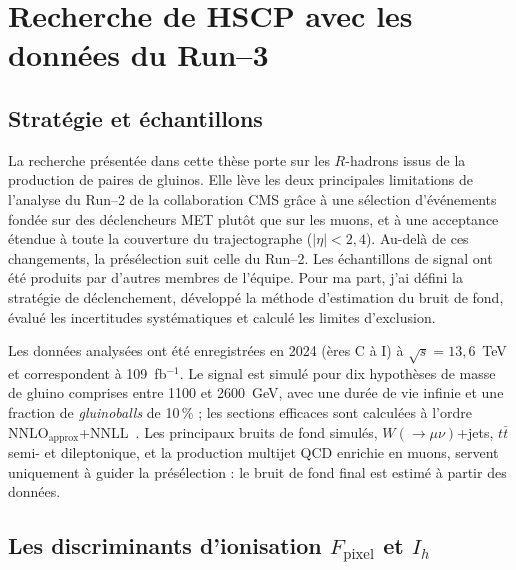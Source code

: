\section{Recherche de HSCP avec les données du Run--3}
\label{sec:resume:analyse}

\subsection{Stratégie et échantillons}

La recherche présentée dans cette thèse porte sur les $R$-hadrons issus de la production de paires de gluinos. Elle lève les deux principales limitations de l'analyse du Run--2 de la collaboration CMS grâce à une sélection d'événements fondée sur des déclencheurs MET plutôt que sur les muons, et à une acceptance étendue à toute la couverture du trajectographe ($|\eta|<2{,}4$). Au-delà de ces changements, la présélection suit celle du Run--2. Les échantillons de signal ont été produits par d'autres membres de l'équipe. Pour ma part, j'ai défini la stratégie de déclenchement, développé la méthode d'estimation du bruit de fond, évalué les incertitudes systématiques et calculé les limites d'exclusion.

Les données analysées ont été enregistrées en 2024 (ères C à I) à $\sqrt{s}=13{,}6$~TeV et correspondent à 109~fb$^{-1}$. Le signal est simulé pour dix hypothèses de masse de gluino comprises entre 1100 et 2600~GeV, avec une durée de vie infinie et une fraction de \textit{gluinoballs} de 10\,\% ; les sections efficaces sont calculées à l'ordre NNLO$_\mathrm{approx}$+NNLL~\cite{10.21468/SciPostPhysCore.7.4.072}. Les principaux bruits de fond simulés, $W(\to\mu\nu)$+jets, $t\bar{t}$ semi- et dileptonique, et la production multijet QCD enrichie en muons, servent uniquement à guider la présélection : le bruit de fond final est estimé à partir des données.

\subsection{Les discriminants d'ionisation \texorpdfstring{$F_\mathrm{pixel}$}{Fpixel} et \texorpdfstring{$I_h$}{Ih}}

